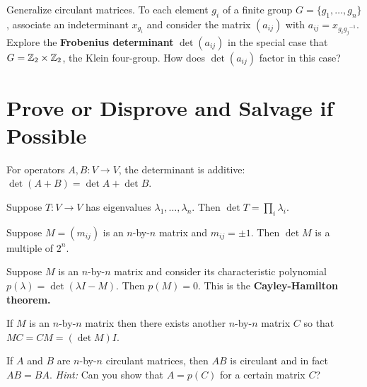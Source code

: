 \documentclass{homework}
\begin{document}
\begin{problem}
  Generalize circulant matrices.  To each element $g_i$ of a finite group $G = \{ g_1, \ldots, g_n \}$, associate an indeterminant $x_{g_i}$ and consider the matrix $(a_{ij})$ with $a_{ij} = x_{g_i {g_j}^{-1}}$.  Explore the \textbf{Frobenius determinant} $\det (a_{ij})$ in the special case that $G = \mathbb{Z}_2 \times \mathbb{Z}_2$, the Klein four-group.  How does  $\det (a_{ij})$ factor in this case?
\end{problem}



\section{Prove or Disprove and Salvage if Possible}

\begin{problem}%
  For operators $A, B : V \to V$, the determinant is additive: $\det (A+B) = \det A + \det B$.
\end{problem}

\begin{problem}%
  Suppose $T : V \to V$ has eigenvalues $\lambda_1,\ldots,\lambda_n$.
  Then $\det T = \prod_i \lambda_i$.
\end{problem}

\begin{problem} %
  Suppose $M = (m_{ij})$ is an $n$-by-$n$ matrix and $m_{ij} = \pm 1$.
  Then $\det M$ is a multiple of $2^{n}$.
\end{problem}

\begin{problem}
  Suppose $M$ is an $n$-by-$n$ matrix and consider its characteristic
  polynomial $p(\lambda) = \det(\lambda I - M)$.  Then $p(M) = 0$.  This is
  the \textbf{Cayley-Hamilton theorem.}
\end{problem}

\begin{problem}
  If $M$ is an $n$-by-$n$ matrix then there exists another $n$-by-$n$
  matrix $C$ so that $MC = CM = (\det M) I$.
\end{problem}

\begin{problem}
  If $A$ and $B$ are $n$-by-$n$ circulant matrices, then $AB$ is circulant and in fact $AB = BA$.
  \textit{Hint:} Can you show that $A = p(C)$ for a certain matrix $C$?
\end{problem}
\end{document}
